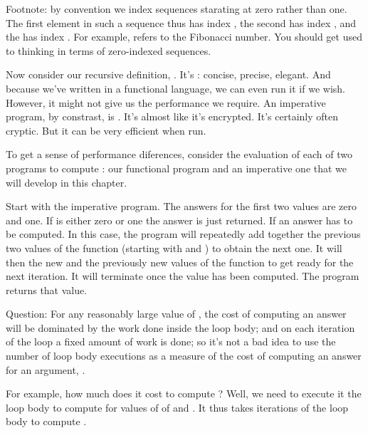 \documentclass[letterpaper,10pt,english]{sphinxmanual}
\begin{document}
Footnote: by convention we index sequences starating at zero rather
than one. The first element in such a sequence thus has index , the
second has index , and the  has index . For example,
 refers to the  Fibonacci number. You should get used to
thinking in terms of zero-indexed sequences.

Now consider our recursive definition, . It’s :
concise, precise, elegant.  And because we’ve written in a functional
language, we can even run it if we wish. However, it might not give us
the performance we require. An imperative program, by constrast, is
. It’s almost like it’s encrypted. It’s certainly often cryptic.
But it can be very efficient when run.

To get a sense of performance diferences, consider the evaluation of
each of two programs to compute : our functional program and
an imperative one that we will develop in this chapter.

Start with the imperative program. The answers for the first two
values are zero and one. If  is either zero or one the answer is
just returned. If  an answer has to be computed. In this case,
the program will repeatedly add together the previous two values of
the function (starting with  and ) to obtain the next one.  It
will then the new and the previously new values of the function to get
ready for the next iteration.  It will terminate once the  value
has been computed. The program returns that value.

Question: For any reasonably large value of , the cost of computing
an answer will be dominated by the work done inside the loop body; and on
each iteration of the loop a fixed amount of work is done; so it’s not a
bad idea to use the number of loop body executions as a measure of the
cost of computing an answer for an argument, .

For example, how much does it cost to compute ? Well, we need
to execute it the loop body to compute  for values of  of
 and . It thus takes  iterations of the loop body to
compute .
\end{document}

